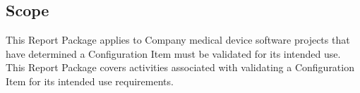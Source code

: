 \subsection{Scope}
This Report Package applies to Company medical device software projects that
have determined a Configuration Item must be validated for its intended use.
This Report Package covers activities associated with validating a Configuration
Item for its intended use requirements.
